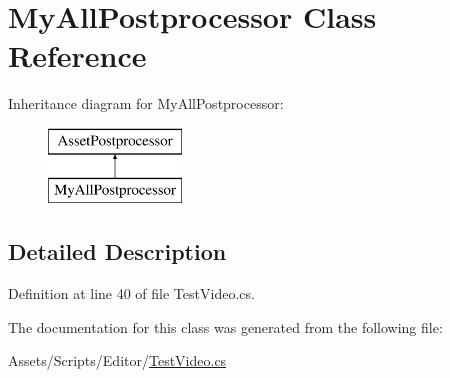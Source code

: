 \hypertarget{class_my_all_postprocessor}{}\section{My\+All\+Postprocessor Class Reference}
\label{class_my_all_postprocessor}
Inheritance diagram for My\+All\+Postprocessor\+:\begin{figure}[H]
\begin{center}
\leavevmode
\includegraphics[height=2.000000cm]{class_my_all_postprocessor}
\end{center}
\end{figure}


\subsection{Detailed Description}


Definition at line 40 of file Test\+Video.\+cs.



The documentation for this class was generated from the following file\+:\begin{DoxyCompactItemize}
\item 
Assets/\+Scripts/\+Editor/\mbox{\hyperlink{_test_video_8cs}{Test\+Video.\+cs}}\end{DoxyCompactItemize}

